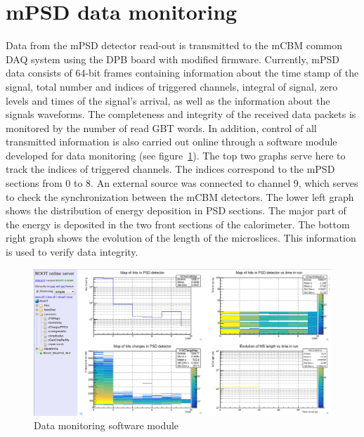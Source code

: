 \documentclass{CBM-PR-2020}
\begin{document}
\section{mPSD data monitoring}
Data from the mPSD detector read-out is transmitted to the mCBM common DAQ system using the DPB board with modified firmware. Currently, mPSD data consists of 64-bit frames containing information about the time stamp of the signal, total number and indices of triggered channels, integral of signal, zero levels and times of the signal's arrival, as well as the information about the signals waveforms.
The completeness and integrity of the received data packets is monitored by the number of read GBT words. In addition, control of all transmitted information is also carried out online through a software module developed for data monitoring (see figure~\ref{fig:5}). The top two graphs serve here to track the indices of triggered channels. The indices correspond to the mPSD sections from 0 to 8. An external source was connected to channel 9, which serves to check the synchronization between the mCBM detectors. The lower left graph shows the distribution of energy deposition in PSD sections. The major part of the energy is deposited in the two front sections of the calorimeter. The bottom right graph shows the evolution of the length of the microslices. This information is used to verify data integrity.

\begin{figure}[htbp]
\centering %
\includegraphics[width=\textwidth]{run582.png}
\caption{\label{fig:5} Data monitoring software module}
\end{figure}
\end{document}
